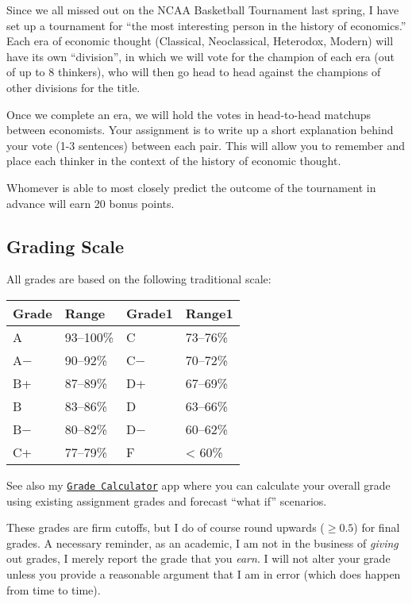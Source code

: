 \documentclass{article}
\begin{document}
Since we all missed out on the NCAA Basketball Tournament last spring, I
have set up a tournament for ``the most interesting person in the
history of economics.'' Each era of economic thought (Classical,
Neoclassical, Heterodox, Modern) will have its own ``division'', in
which we will vote for the champion of each era (out of up to 8
thinkers), who will then go head to head against the champions of other
divisions for the title.

Once we complete an era, we will hold the votes in head-to-head matchups
between economists. Your assignment is to write up a short explanation
behind your vote (1-3 sentences) between each pair. This will allow you
to remember and place each thinker in the context of the history of
economic thought.

Whomever is able to most closely predict the outcome of the tournament
in advance will earn 20 bonus points.

\hypertarget{grading-scale}{%
\subsection*{Grading Scale}\label{grading-scale}}

All grades are based on the following traditional scale:

\begin{center}

\begin{tabular}{llll}
\toprule
Grade & Range & Grade1 & Range1\\
\midrule
A & 93–100\% & C & 73–76\%\\
A− & 90–92\% & C− & 70–72\%\\
B+ & 87–89\% & D+ & 67–69\%\\
B & 83–86\% & D & 63–66\%\\
B− & 80–82\% & D− & 60–62\%\\
\addlinespace
C+ & 77–79\% & F & < 60\%\\
\bottomrule
\end{tabular}
\end{center}

See also my
\href{https://ryansafner.shinyapps.io/452_grade_calculator/}{
\texttt{Grade\ Calculator}} app where you can calculate your overall
grade using existing assignment grades and forecast ``what if''
scenarios.

These grades are firm cutoffs, but I do of course round upwards
(\(\geq 0.5\)) for final grades. A necessary reminder, as an academic, I
am not in the business of \emph{giving} out grades, I merely report the
grade that you \emph{earn}. I will not alter your grade unless you
provide a reasonable argument that I am in error (which does happen from
time to time).
\end{document}
